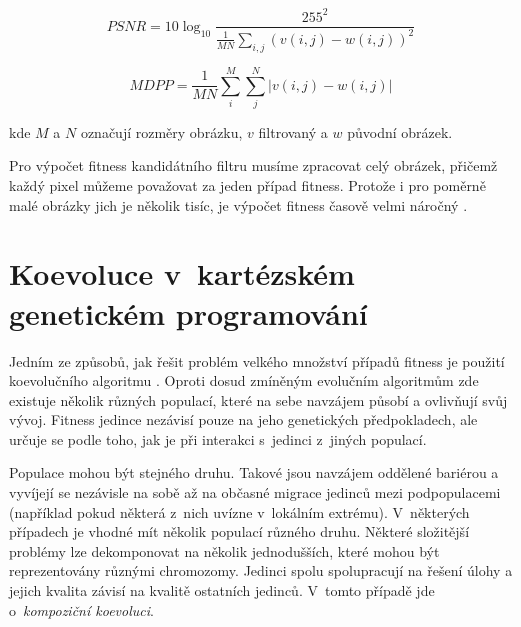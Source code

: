 \begin{equation}
    \label{eqPSNR}
    \mathit{PSNR} = 10 \log_{10} \frac{255^2}{\frac{1}{MN} \sum\limits_{i,j} \left( v\left( i, j \right) - w\left( i, j \right)  \right)^2 }
\end{equation}

\begin{equation}
    \label{eqMDPP}
    \mathit{MDPP} = \frac{1}{MN} \sum\limits_i^M \sum\limits_j^N \left| v\left( i, j \right) - w\left( i, j \right) \right|
\end{equation}

\noindent{}kde $M$ a $N$ označují rozměry obrázku, $v$ filtrovaný a $w$ původní obrázek.

Pro výpočet fitness kandidátního filtru musíme zpracovat celý obrázek, přičemž každý pixel můžeme považovat za jeden případ fitness. Protože i pro poměrně malé obrázky jich je několik tisíc, je výpočet fitness časově velmi náročný \cite{Modra, ZelenaIF}.

\section{Koevoluce v~kartézském genetickém programování}
\label{secCoev}

Jedním ze způsobů, jak řešit problém velkého množství případů fitness je použití koevolučního algoritmu \cite{HandbookCoev}. Oproti dosud zmíněným evolučním algoritmům zde existuje několik různých populací, které na sebe navzájem působí a ovlivňují svůj vývoj. Fitness jedince nezávisí pouze na jeho genetických předpokladech, ale určuje se podle toho, jak  je při interakci s~jedinci z~jiných populací.

Populace mohou být stejného druhu. Takové jsou navzájem oddělené bariérou a vyvíjejí se nezávisle na sobě až na občasné migrace jedinců mezi podpopulacemi (například pokud některá z~nich uvízne v~lokálním extrému). V~některých případech je vhodné mít několik populací různého druhu. Některé složitější problémy lze dekomponovat na několik jednodušších, které mohou být reprezentovány různými chromozomy. Jedinci spolu spolupracují na řešení úlohy a jejich kvalita závisí na kvalitě ostatních jedinců. V~tomto případě jde o~\emph{kompoziční koevoluci}.

